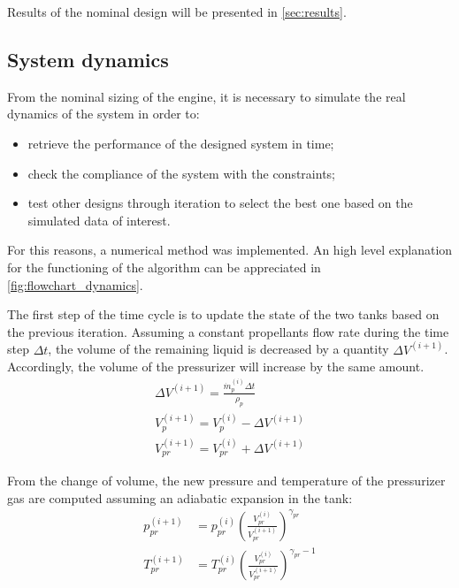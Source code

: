 Results of the nominal design will be presented in \autoref{sec:results}.
 
\subsection{System dynamics}
\label{subsec:dynamics}

From the nominal sizing of the engine, it is necessary to simulate the real dynamics of the system in order to:

\begin{itemize}
    \item retrieve the performance of the designed system in time;
    \item check the compliance of the system with the constraints;
    \item test other designs through iteration to select the best one based on the simulated data of interest.
\end{itemize}

For this reasons, a numerical method was implemented. An high level explanation for the functioning of the algorithm can be appreciated in \autoref{fig:flowchart_dynamics}.


The first step of the time cycle is to update the state of the two tanks based on the previous iteration. Assuming a constant propellants flow rate during the time step $\Delta t$, the volume of the remaining liquid is decreased by a quantity $\Delta V ^ {(i+1)}$. Accordingly, the volume of the pressurizer will increase by the same amount.
\begin{gather}
    \Delta V ^ {(i+1)} = \frac{\dot{m}_p^{(i)} \Delta t}{\rho_p} \\
    V_p ^ {(i+1)} = V_p ^ {(i)} - \Delta V ^ {(i+1)} \\
    V_{pr} ^ {(i+1)} = V_{pr} ^ {(i)} + \Delta V ^ {(i+1)}
\end{gather}

From the change of volume, the new pressure and temperature of the pressurizer gas are computed assuming an adiabatic expansion in the tank:
\begin{align}
    p_{pr} ^ {(i+1)} &= p_{pr} ^ {(i)} \left( \frac{V_{pr} ^ {(i)}}{V_{pr} ^ {(i+1)}} \right) ^ {\gamma_{pr}} \\
    T_{pr} ^ {(i+1)} &= T_{pr} ^ {(i)} \left( \frac{V_{pr} ^ {(i)}}{V_{pr} ^ {(i+1)}} \right) ^ {\gamma_{pr} - 1}
\end{align}

